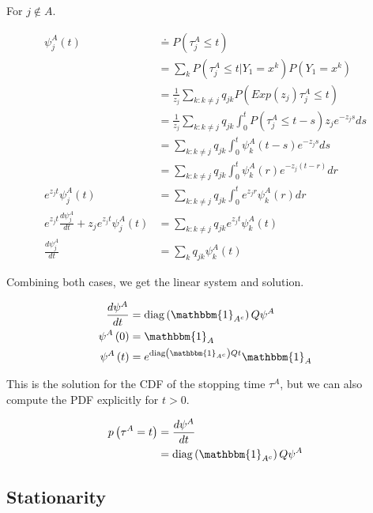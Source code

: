 For $j \not\in A$.

\begin{align}
\psi_j^A\left(t\right) &\doteq P\left(\tau^A_j \leq t\right) \\
                       &= \sum_k P\left(\tau^A_j \leq t | Y_1 = x^k\right) P\left(Y_1 = x^k\right) \\ 
                       &= \frac{1}{z_j}\sum_{k: k \neq j} q_{jk} P\left(Exp\left(z_j\right)\tau^A_j \leq t\right)  \\
                       &= \frac{1}{z_j}\sum_{k: k \neq j} q_{jk} \int^t_0 P\left(\tau^A_j \leq t - s\right) z_j e^{-z_j s} ds  \\
                       &= \sum_{k: k \neq j} q_{jk} \int^t_0\psi^A_k\left(t-s\right)e^{-z_j s} ds  \\
                       &= \sum_{k: k \neq j} q_{jk} \int^t_0\psi^A_k\left(r\right)e^{-z_j\left(t-r\right)} dr  \\
e^{z_jt}\psi^A_j\left(t\right) &= \sum_{k: k \neq j} q_{jk} \int^t_0 e^{z_jr}\psi^A_k\left(r\right) dr  \\
e^{z_jt}\frac{d\psi^A_j}{dt} + z_j e^{z_j t} \psi^A_j\left(t\right) &= \sum_{k: k \neq j} q_{jk} e^{z_jt}\psi^A_k\left(t\right)  \\
\frac{d\psi^A_j}{dt} &= \sum_{k} q_{jk} \psi^A_k\left(t\right) 
\end{align}

Combining both cases, we get the linear system and solution.

\begin{align}
        \frac{d\psi^A}{dt} &= \diag\left(\mathbbm{1}_{A^c}\right)Q\psi^A \\
        \psi^A\left(0\right) &= \mathbbm{1}_{A} \\
        \psi^A\left(t\right) &= e^{\diag\left(\mathbbm{1}_{A^c}\right)Qt} \mathbbm{1}_{A} \\ 
\end{align}

This is the solution for the CDF of the stopping time $\tau^A$, but we can also compute the PDF explicitly for $t > 0$.

\begin{align}
        p\left(\tau^A = t\right) &= \frac{d\psi^A}{dt} \\
        &= \diag\left(\mathbbm{1}_{A^c}\right)Q\psi^A
\end{align} 



\subsection{Stationarity}


